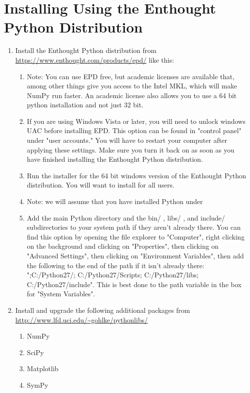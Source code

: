 \section*{Installing Using the Enthought Python Distribution}
\begin{enumerate}

\item Install the Enthought Python distribution from \url{https://www.enthought.com/products/epd/} like this:
\begin{enumerate}
	\item Note: You can use EPD free, but academic licenses are available that, among other things give you access to the Intel MKL, which will make NumPy run faster.
		An academic license also allows you to use a 64 bit python installation and not just 32 bit.
	\item If you are using Windows Vista or later, you will need to unlock windows UAC before installing EPD.
		This option can be found in "control panel" under "user accounts."
		You will have to restart your computer after applying these settings.
		Make sure you turn it back on as soon as you have finished installing the Enthought Python distribution.
	\item Run the installer for the 64 bit windows version of the Enthought Python distribution.
		You will want to install for all users.
	\item Note: we will assume that you have installed Python under 
	\item Add the main Python directory and the bin/ , libs/ , and include/ subdirectories to your system path if they aren't already there.
You can find this option by opening the file explorer to "Computer", right clicking on the background and clicking on "Properties", then clicking on "Advanced Settings", then clicking on "Environment Variables", then add the following to the end of the path if it isn't already there: ";C:/Python27/; C:/Python27/Scripts; C:/Python27/libs; C:/Python27/include". This is best done to the path variable in the box for "System Variables".
\end{enumerate}
\item Install and upgrade the following additional packages from \url{http://www.lfd.uci.edu/~gohlke/pythonlibs/}
\begin{enumerate}
	\item NumPy
	\item SciPy
	\item Matplotlib
	\item SymPy

\end{enumerate}
\end{enumerate}
